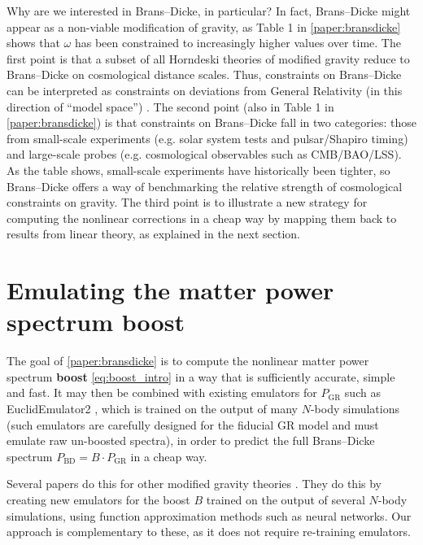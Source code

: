 \documentclass[USenglish, thumbmarks]{uiophdthesis} %
\newcommand\GR{General Relativity}
\newcommand\BD{Brans--Dicke}
\begin{document}
Why are we interested in \BD{}, in particular?
In fact, \BD{} might appear as a non-viable modification of gravity,
as Table 1 in \cref{paper:bransdicke} shows that $\omega$ has been constrained to increasingly higher values over time.
The first point is that a subset of all Horndeski theories of modified gravity
reduce to \BD{} on cosmological distance scales.
Thus, constraints on \BD{} can be interpreted as constraints on deviations from \GR{}
(in this direction of \enquote{model space})
\cite{avilezCosmologicalConstraintsBransDicke2014b,joudakiTestingGravityCosmic2022a}.
The second point (also in Table 1 in \cref{paper:bransdicke}) is that constraints on \BD{} fall in two categories:
those from small-scale experiments (e.g. solar system tests and pulsar/Shapiro timing) and large-scale probes (e.g. cosmological observables such as CMB/BAO/LSS).
As the table shows, small-scale experiments have historically been tighter,
so \BD{} offers a way of benchmarking the relative strength of cosmological constraints on gravity.
The third point is to illustrate a new strategy for
computing the nonlinear corrections in a cheap way by mapping them back to results from linear theory,
as explained in the next section.

\section{Emulating the matter power spectrum boost}
\label{sec:boost}

The goal of \cref{paper:bransdicke} is to compute the nonlinear matter power spectrum \textbf{boost} \eqref{eq:boost_intro}
in a way that is sufficiently accurate, simple and fast.
It may then be combined with existing emulators for $P_\mathrm{GR}$
such as EuclidEmulator2 \cite{collaborationEuclidPreparationIX2021a},
which is trained on the output of many $N$-body simulations
(such emulators are carefully designed for the fiducial GR model and must emulate raw un-boosted spectra),
in order to predict the full \BD{} spectrum $P_\mathrm{BD} = B \cdot P_\mathrm{GR}$ in a cheap way.

Several papers do this for other modified gravity theories \cite[e.g.][]{wintherEmulatorsNonlinearMatter2019a,ramachandraMatterPowerSpectrum2021,brandoEnablingMatterPower2022a,fioriniFastProductionCosmological2023,saez-casaresEMANTISEmulatorFast2023a,maulandSesamePowerSpectrum2024a}.
They do this by creating new emulators for the boost $B$ trained on the output of several $N$-body simulations,
using function approximation methods such as neural networks.
Our approach is complementary to these, as it does not require re-training emulators.
\end{document}
